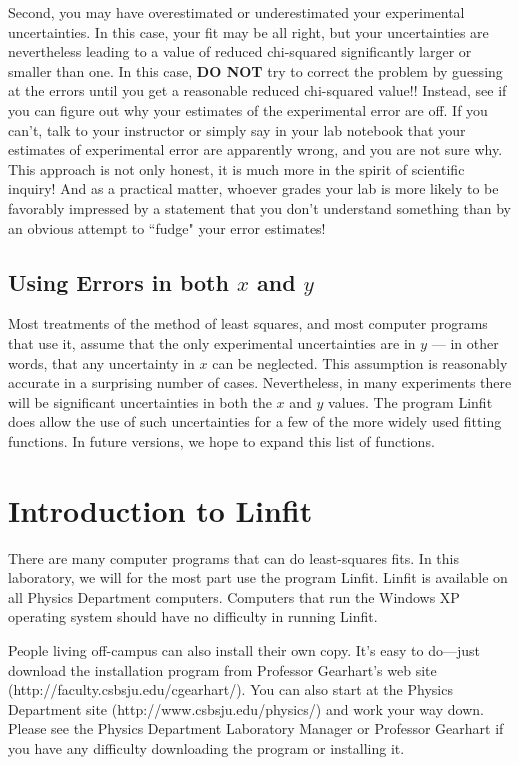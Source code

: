 Second, you may have overestimated or underestimated your experimental
uncertainties.  In this case, your fit may be all right, but your
uncertainties are nevertheless leading to a value of reduced
chi-squared significantly larger or smaller than one.  In this case,
{\bf DO NOT} try to correct the problem by guessing at the errors until you
get a reasonable reduced chi-squared value!!  Instead, see if you can
figure out why your estimates of the experimental error are off.  If
you can't, talk to your instructor or simply say in your lab notebook
that your estimates of experimental error are apparently wrong, and
you are not sure why.  This approach is not only honest, it is much
more in the spirit of scientific inquiry!  And as a practical matter,
whoever grades your lab is more likely to be favorably impressed by a statement
that you don't understand something than by an obvious attempt to
``fudge" your error estimates!

\subsection*{Using Errors in both $x$ and $y$}

Most treatments of the method of least squares, and most computer
programs that use it, assume that the only experimental uncertainties
are in $y$ --- in other words, that any uncertainty in $x$ can be
neglected.  This assumption is reasonably accurate in a surprising
number of cases.  Nevertheless, in many experiments there will be
significant uncertainties in both the $x$ and $y$ values.  The program
Linfit does allow the use of such uncertainties for a few of the more
widely used fitting functions.  In future versions, we hope to expand
this list of functions.



\newpage
\section*{Introduction to Linfit}

There are many computer programs that can do least-squares fits.  In
this laboratory, we will for the most part use the program Linfit.
Linfit is available on all Physics Department computers.  Computers 
that run the Windows XP
operating system should have no difficulty in running Linfit.

People living off-campus can
also install their own copy.  It's easy to do---just download  
the installation program from Professor Gearhart's web 
site (http://faculty.csbsju.edu/cgearhart/).  You can also start at the
Physics Department site (http://www.csbsju.edu/physics/) and work your
way down.  Please see the Physics Department
Laboratory Manager or Professor Gearhart if you have any difficulty
downloading the program or installing it.

